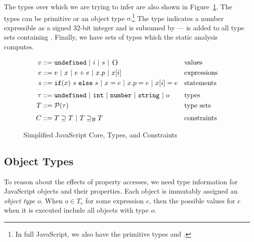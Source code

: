 The types over which we are trying to infer are also shown in
Figure~\ref{fig:js-core}. The types can be primitive or an object type
$o$.\footnote{In full JavaScript, we also have the primitive types 
  and .} The  type indicates a number expressible as a
signed 32-bit integer and is subsumed by  ---  is
added to all type sets containing . Finally, we have sets of
types which the static analysis computes.

\newcommand{\barrier}{\supseteq_\mathcal{B}}

\begin{figure}
\begin{align*}
v & ::= \code{undefined}\ |\ i\ |\ s\ |\ \text{\code{\{\}}} && \text{values}\\
e & ::= v\ |\ x\ |\ e + e\ |\ x.p\ |\ x[i]\ && \text{expressions}\\
s & ::= \code{if}(x)\ s\ \code{else}\ s\ |\ x = e\ |\ x.p = e\ |\ x[i] = e && \text{statements}\\[0.7ex]
\tau & ::= \code{undefined}\ |\ \code{int}\ |\ \code{number}\ |\ \code{string}\ |\ o && \text{types}\\
T & ::= \mathcal{P}(\tau) && \text{type sets}\\[0.8ex]
C & ::= T \supseteq T\ |\ T \barrier T && \text{constraints}
\end{align*}
\caption{Simplified JavaScript Core, Types, and Constraints}
\label{fig:js-core}
\end{figure}



\subsection{Object Types}
\label{sec:object-types}

To reason about the effects of property accesses, we need type information
for JavaScript objects and their properties.
Each object is immutably assigned an {\it object type} $o$.
When $o \in T_e$ for some expression $e$, then the possible values
for $e$ when it is executed include all objects with type $o$.

